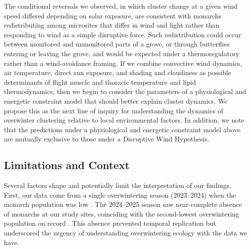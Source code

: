 \documentclass[insects,article,submit,pdftex,moreauthors]{Definitions/mdpi}
\begin{document}
The conditional reversals we observed, in which cluster change at a given wind speed differed depending on solar exposure, are consistent with monarchs redistributing among microsites that differ in wind and light rather than responding to wind as a simple disruptive force. Such redistribution could occur between monitored and unmonitored parts of a grove, or through butterflies entering or leaving the grove, and would be expected under a thermoregulatory rather than a wind-avoidance framing. If we combine convective wind dynamics, air temperature, direct sun exposure, and shading and cloudiness as possible determinants of flight muscle and thoracic temperature and lipid thermodynamics, then we begin to consider the parameters of a physiological and energetic constraint model that should better explain cluster dynamics. We propose this as the next line of inquiry for understanding the dynamics of overwinter clustering relative to local environmental factors. In addition, we note that the predictions under a physiological and energetic constraint model above are mutually exclusive to those under a Disruptive Wind Hypothesis.

\subsection{Limitations and Context}

Several factors shape and potentially limit the interpretation of our findings. First, our data come from a single overwintering season (2023--2024) when the monarch population was low \cite{xercessocietyWesternMonarchButterfly2025,ibsenDensityDependenceHabitat2026}. The 2024--2025 season saw near-complete absence of monarchs at our study sites, coinciding with the second-lowest overwintering population on record \cite{xercessocietyWesternMonarchThanksgiving2025}. This absence prevented temporal replication but underscored the urgency of understanding overwintering ecology with the data we have.
\end{document}
